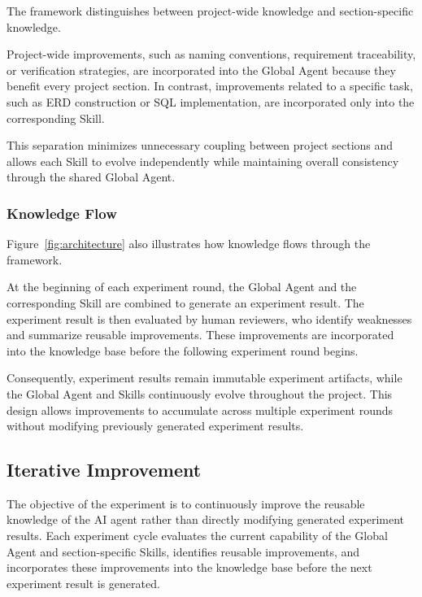 The framework distinguishes between project-wide knowledge and section-specific knowledge.

Project-wide improvements, such as naming conventions, requirement traceability, or verification strategies, are incorporated into the Global Agent because they benefit every project section. In contrast, improvements related to a specific task, such as ERD construction or SQL implementation, are incorporated only into the corresponding Skill.

This separation minimizes unnecessary coupling between project sections and allows each Skill to evolve independently while maintaining overall consistency through the shared Global Agent.

\subsubsection{Knowledge Flow}

Figure~\ref{fig:architecture} also illustrates how knowledge flows through the framework.

At the beginning of each experiment round, the Global Agent and the corresponding Skill are combined to generate an experiment result. The experiment result is then evaluated by human reviewers, who identify weaknesses and summarize reusable improvements. These improvements are incorporated into the knowledge base before the following experiment round begins.

Consequently, experiment results remain immutable experiment artifacts, while the Global Agent and Skills continuously evolve throughout the project. This design allows improvements to accumulate across multiple experiment rounds without modifying previously generated experiment results.

\subsection{Iterative Improvement}

The objective of the experiment is to continuously improve the reusable knowledge of the AI agent rather than directly modifying generated experiment results. Each experiment cycle evaluates the current capability of the Global Agent and section-specific Skills, identifies reusable improvements, and incorporates these improvements into the knowledge base before the next experiment result is generated.

